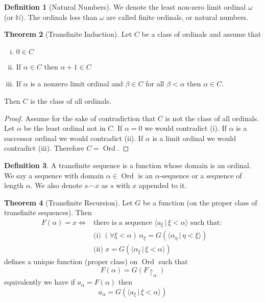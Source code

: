 \documentclass{article}
\theoremstyle{definition}
\newtheorem{thm}{Theorem}[section]
\newtheorem{defn}[thm]{Definition}
\newcommand{\N}{\mathbb{N}}
\DeclareMathOperator{\Ord}{Ord}
\begin{document}
\begin{defn}[Natural Numbers]
    We denote the least non-zero limit ordinal $\omega$ (or $\N$). The ordinals less than $\omega$ are called finite ordinals, or natural numbers.
\end{defn}

\newpage

\begin{thm}[Transfinite Induction]
    Let $C$ be a class of ordinals and assume that 
    \begin{enumerate}[(i)]
        \item $0 \in C$
        \item If $\alpha \in C$ then $\alpha + 1 \in C$
        \item If $\alpha$ is a nonzero limit ordinal and $\beta \in C$ for all $\beta < \alpha$ then $\alpha \in C$.
    \end{enumerate}
    Then $C$ is the class of all ordinals.
\end{thm}

\begin{proof}
    Assume for the sake of contradiction that $C$ is not the class of all ordinals. Let $\alpha$ be the least ordinal not in $C$. If $\alpha = 0$ we would contradict (i). If $\alpha$ is a successor ordinal we would contradict (ii). If $\alpha$ is a limit ordinal we would contradict (iii). Therefore $C = \Ord$.
\end{proof}

\begin{defn}
    A transfinite sequence is a function whose domain is an ordinal. We say a sequence with domain $\alpha \in \Ord$ is an $\alpha$-sequence or a sequence of length $\alpha$. We also denote $s \frown x$ as $s$ with $x$ appended to it.
\end{defn}

\begin{thm}[Transfinite Recursion]
    Let $G$ be a function (on the proper class of transfinite sequences). Then  
    \begin{align*}
        F(\alpha) = x \iff & \text{there is a sequence $\langle a_\xi \, | \, \xi < \alpha \rangle$ such that: }    
        \\
        & \text{(i)} \, \, (\forall \xi < \alpha) \, \alpha_\xi = G(\langle \alpha_\eta \, | \, \eta < \xi \rangle)
        \\
        & \text{(ii)} \, \,  x = G(\langle \alpha_\xi \, | \, \xi < \alpha \rangle)
    \end{align*}
    defines a unique function (proper class) on $\Ord$ such that 
    \[
        F(\alpha) = G(F \restriction_\alpha)    
    \]
    equivalently we have if $a_\alpha = F(\alpha)$ then 
    \[
        a_\alpha = G(\langle a_\xi \, | \, \xi < \alpha \rangle)    
    \]
\end{thm}
\end{document}
